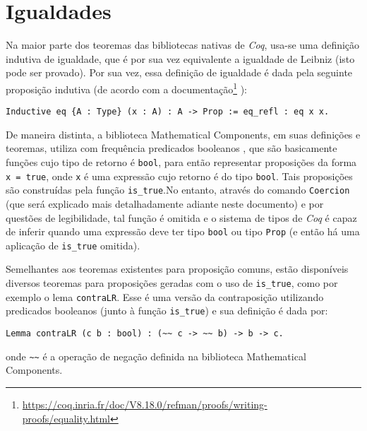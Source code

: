 \section{Igualdades}
Na maior parte dos teoremas das bibliotecas nativas de \textit{Coq}, usa-se uma definição indutiva de igualdade, que é por sua vez equivalente a igualdade de Leibniz (isto pode ser provado). Por sua vez, essa definição de igualdade é dada pela seguinte proposição indutiva (de acordo com a documentação\footnote{\url{https://coq.inria.fr/doc/V8.18.0/refman/proofs/writing-proofs/equality.html}} \cite{coqteam2022manual}):
    \begin{lstlisting}[language=coq,frame=single,tabsize=1]
Inductive eq {A : Type} (x : A) : A -> Prop := eq_refl : eq x x.
    \end{lstlisting}

De maneira distinta, a biblioteca Mathematical Components, em suas definições e teoremas, utiliza com frequência predicados booleanos \cite{assia_mahboubi_2022_7118596}, que são basicamente funções cujo tipo de retorno é \lstinline[language = coq]!bool!, para então representar proposições da forma \lstinline[language = coq]$x = true$, onde \lstinline[language = coq]$x$ é uma expressão cujo retorno é do tipo \lstinline[language = coq]!bool!. Tais proposições são construídas pela função \lstinline[language = coq]$is_true$.No entanto, através do comando \lstinline[language = coq]$Coercion$ (que será explicado mais detalhadamente adiante neste documento) e por questões de legibilidade, tal função é omitida e o sistema de tipos de \textit{Coq} é capaz de inferir quando uma expressão deve ter tipo \lstinline[language = coq]$bool$ ou tipo \lstinline[language = coq]$Prop$ (e então há uma aplicação de \lstinline[language = coq]$is_true$ omitida). 

Semelhantes aos teoremas existentes para proposição comuns, estão disponíveis diversos teoremas para proposições geradas com o uso de \lstinline[language = coq]$is_true$, como por exemplo o lema \lstinline[language = coq]$contraLR$. Esse é uma versão da contraposição utilizando predicados booleanos (junto à função \lstinline[language = coq]$is_true$) e sua definição é dada por:
    \begin{lstlisting}[language=coq,frame=single,tabsize=1]
Lemma contraLR (c b : bool) : (~~ c -> ~~ b) -> b -> c.
    \end{lstlisting}
onde \lstinline[language = coq]$~~$ é a operação de negação definida na biblioteca Mathematical Components.

